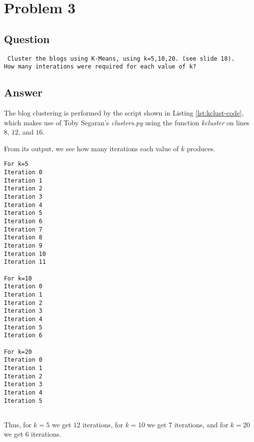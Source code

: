 \section{Problem 3}
\label{part3}
\subsection*{Question}
\begingroup
\begin{verbatim}
 Cluster the blogs using K-Means, using k=5,10,20. (see slide 18).
How many interations were required for each value of k?
\end{verbatim}
\subsection{Answer}

The blog clustering is performed by the script shown in Listing \ref{lst:kclust-code}, which makes use of Toby Segaran's \emph{clusters.py}  using the function \emph{kcluster} on lines $8$, $12$, and $16$.



\newpage
From its output, we see how many iterations each value of $k$ produces.
\begin{lstlisting}[frame=single]
For k=5
Iteration 0
Iteration 1
Iteration 2
Iteration 3
Iteration 4
Iteration 5
Iteration 6
Iteration 7
Iteration 8
Iteration 9
Iteration 10
Iteration 11

For k=10
Iteration 0
Iteration 1
Iteration 2
Iteration 3
Iteration 4
Iteration 5
Iteration 6

For k=20
Iteration 0
Iteration 1
Iteration 2
Iteration 3
Iteration 4
Iteration 5


\end{lstlisting}

Thus, for $k=5$ we get $12$ iterations, for $k=10$ we get $7$ iterations, and for $k=20$ we get $6$ iterations.